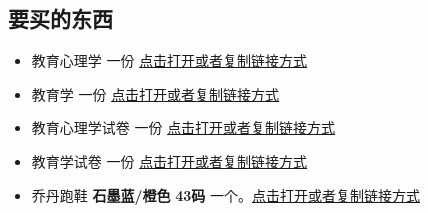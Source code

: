 \documentclass[11pt,oneside]{book}
\begin{document}
\begin{common-format}
\section{要买的东西}

\begin{itemize}
\item 教育心理学 一份 \href{http://product.dangdang.com/22936801.html}{点击打开或者复制链接方式}
\item 教育学 一份 \href{http://product.dangdang.com/22936802.html#ddclick_reco_reco_buytogether}{点击打开或者复制链接方式}

\item 教育心理学试卷 一份 \href{http://product.dangdang.com/22936805.html#ddclick_reco_reco_buytogether}{点击打开或者复制链接方式}

\item 教育学试卷 一份 \href{http://product.dangdang.com/22936806.html#ddclick_reco_reco_buytogether}{点击打开或者复制链接方式}

\item 乔丹跑鞋 \textbf{石墨蓝/橙色} \textbf{43码} 一个。\href{http://product.dangdang.com/1138689322.html}{点击打开或者复制链接方式}
\end{itemize}



\end{common-format}
\end{document}
